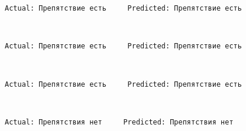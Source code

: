 \documentclass[11pt]{article}
\begin{document}
    \begin{Verbatim}[commandchars=\\\{\}]
Actual: Препятствие есть     Predicted: Препятствие есть

    \end{Verbatim}

    \begin{center}
    \end{center}
    { \hspace*{\fill} \\}
    
    \begin{Verbatim}[commandchars=\\\{\}]
Actual: Препятствие есть     Predicted: Препятствие есть

    \end{Verbatim}

    \begin{center}
    \end{center}
    { \hspace*{\fill} \\}
    
    \begin{Verbatim}[commandchars=\\\{\}]
Actual: Препятствие есть     Predicted: Препятствие есть

    \end{Verbatim}

    \begin{center}
    \end{center}
    { \hspace*{\fill} \\}
    
    \begin{Verbatim}[commandchars=\\\{\}]
Actual: Препятствия нет     Predicted: Препятствия нет

    \end{Verbatim}

    \begin{center}
    \end{center}
    { \hspace*{\fill} \\}
    
\end{document}
